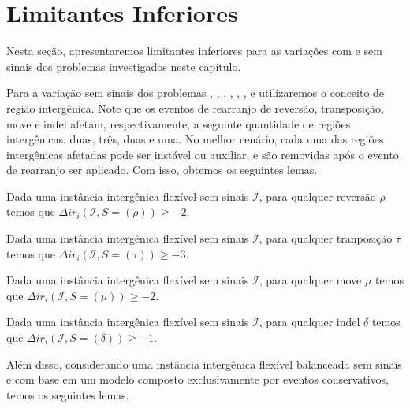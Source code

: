 \section{Limitantes Inferiores}

Nesta seção, apresentaremos limitantes inferiores para as variações com e sem sinais dos problemas investigados neste capítulo.

Para a variação sem sinais dos problemas \SbFIR{}, \SbFIRI{}, \SbFIRM{}, \SbFIRMI{}, \SbFIRT{}, \SbFIRTI{}, \SbFIRTM{} e  \SbFIRTMI{} utilizaremos o conceito de região intergênica. Note que os eventos de rearranjo de reversão, transposição, move e indel afetam, respectivamente, a seguinte quantidade de regiões intergênicas: duas, três, duas e uma. No melhor cenário, cada uma das regiões intergênicas afetadas pode ser instável ou auxiliar, e são removidas após o evento de rearranjo ser aplicado. Com isso, obtemos os seguintes lemas.

\begin{lemma}\label{lemma:VJKGLBQG}
Dada uma instância intergênica flexível sem sinais $\mathcal{I}$, para qualquer reversão $\rho$ temos que $\Delta ir_i(\mathcal{I}, S = (\rho)) \ge -2$.
\end{lemma}

\begin{lemma}\label{lemma:XLUTQDGV}
Dada uma instância intergênica flexível sem sinais $\mathcal{I}$, para qualquer tranposição $\tau$ temos que $\Delta ir_i(\mathcal{I}, S = (\tau)) \ge -3$.
\end{lemma}

\begin{lemma}\label{lemma:ZOCGWWGV}
Dada uma instância intergênica flexível sem sinais $\mathcal{I}$, para qualquer move $\mu$ temos que $\Delta ir_i(\mathcal{I}, S = (\mu)) \ge -2$.
\end{lemma}

\begin{lemma}\label{lemma:HQJMMZCU}
Dada uma instância intergênica flexível sem sinais $\mathcal{I}$, para qualquer indel $\delta$ temos que $\Delta ir_i(\mathcal{I}, S = (\delta)) \ge -1$.
\end{lemma}

Além disso, considerando uma instância intergênica flexível balanceada sem sinais e com base em um modelo composto exclusivamente por eventos conservativos, temos os seguintes lemas.

